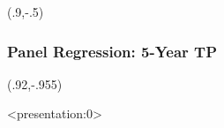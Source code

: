 \documentclass[12pt, aspectratio=169, xcolor=dvipsnames]{beamer} 			         %
\begin{document}
\begin{frame}
	
\end{frame}

\begin{frame}[label=corr_5yr]
	
	\begin{textblock*}{3cm}(.9\textwidth,-.5\textheight)
		\hyperlink{corr_10yr}{}
	\end{textblock*}
\end{frame}

\begin{frame}[label=pnl_tp5yr]
	\frametitle{Panel Regression: 5-Year TP}
	{\centering
	 \par}
	\begin{textblock*}{3cm}(.92\textwidth,-.955\textheight)
			\hyperlink{pnl_tp10yr}{}
	\end{textblock*}
\end{frame}

\begin{frame}<presentation:0>
 

\end{frame}
\end{document}

